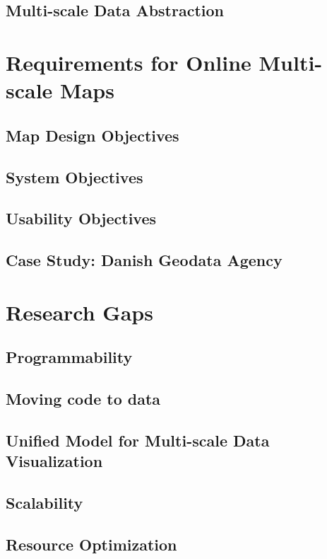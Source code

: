 \documentclass[11pt, oneside]{report}   	%
\begin{document}
\subsection{Multi-scale Data Abstraction}

\section{Requirements for Online Multi-scale Maps}
\subsection{Map Design Objectives}
\subsection{System Objectives}
\subsection{Usability Objectives}
\subsection{Case Study: Danish Geodata Agency}

\section{Research Gaps}
\subsection{Programmability}
\subsection{Moving code to data}
\subsection{Unified Model for Multi-scale Data Visualization}
\subsection{Scalability}
\subsection{Resource Optimization}
\end{document}
